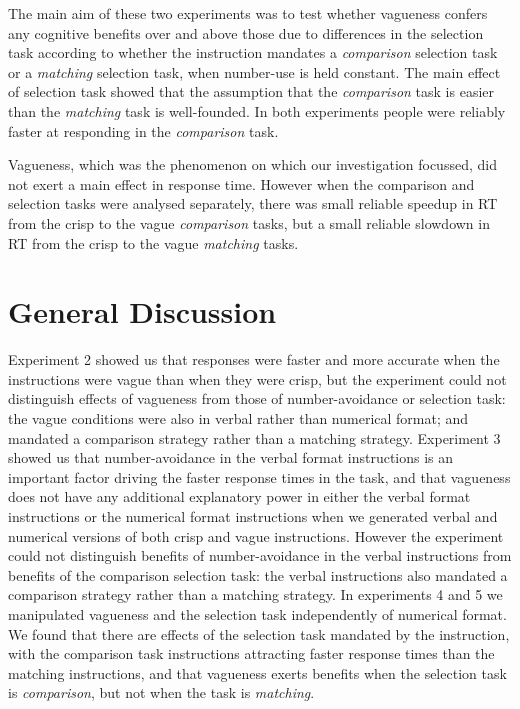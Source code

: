 \documentclass[doc,apacite]{apa6}
\begin{document}
The main aim of these two experiments was to test whether vagueness confers any cognitive benefits over and above those due to differences in the selection task according to whether the instruction mandates a \emph{comparison} selection task or a \emph{matching} selection task, when number-use is held constant.  The main effect of selection task showed that the assumption that the \emph{comparison} task is easier than the \emph{matching} task is well-founded. In both experiments people were reliably faster at responding in the \emph{comparison} task. 

Vagueness, which was the phenomenon  on which our investigation focussed, did not exert a main effect in response time. However when the comparison and selection tasks were analysed separately, there was small reliable speedup in RT from the crisp to the vague \emph{comparison} tasks, but a small reliable slowdown in RT from the crisp to the vague \emph{matching} tasks. 

\section{General Discussion}

Experiment 2 showed us that responses were faster and more accurate when the instructions were vague than when they were crisp, but the experiment could not distinguish effects of vagueness from those of number-avoidance or selection task: the vague conditions were also in verbal rather than numerical format; and mandated a comparison strategy rather than a matching strategy.  Experiment 3 showed us that number-avoidance in the verbal format instructions is an important factor driving the faster response times in the task, and that vagueness does not have any additional explanatory power in either the verbal format instructions or the numerical format instructions when we generated verbal and numerical versions of both crisp and vague instructions. However the experiment could not distinguish benefits of number-avoidance in the verbal instructions from benefits of the comparison selection task: the verbal instructions also mandated a comparison strategy rather than a matching strategy. In experiments 4 and 5 we manipulated vagueness and the selection task independently of numerical format. We found that there are effects of the selection task mandated by the instruction, with the comparison task instructions attracting faster response times than the matching instructions, and that vagueness exerts benefits when the selection task is \emph{comparison}, but not when the task is \emph{matching}.
\end{document}
